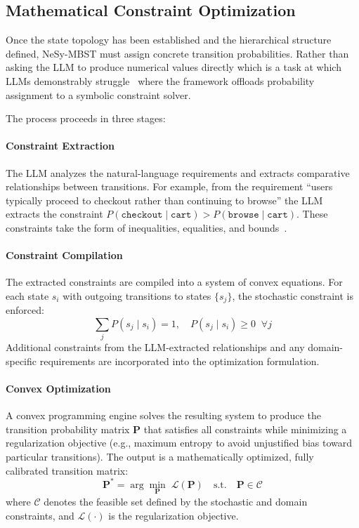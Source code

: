 \subsection{Mathematical Constraint Optimization}%
\label{subsec:constraint_opt}

Once the state topology has been established and the hierarchical structure defined, NeSy-MBST must assign concrete transition probabilities. Rather than asking the LLM to produce numerical values directly which is a task at which LLMs demonstrably struggle~\cite{llm_numerical_reasoning} where the framework offloads probability assignment to a symbolic constraint solver.

The process proceeds in three stages:

\paragraph{Constraint Extraction}
The LLM analyzes the natural-language requirements and extracts comparative relationships between transitions. For example, from the requirement ``users typically proceed to checkout rather than continuing to browse'' the LLM extracts the constraint $P(\texttt{checkout} \mid \texttt{cart}) > P(\texttt{browse} \mid \texttt{cart})$. These constraints take the form of inequalities, equalities, and bounds~\cite{boehr_constraints}.

\paragraph{Constraint Compilation}
The extracted constraints are compiled into a system of convex equations. For each state $s_i$ with outgoing transitions to states $\{s_j\}$, the stochastic constraint is enforced:
\begin{equation}
    \sum_{j} P(s_j \mid s_i) = 1, \quad P(s_j \mid s_i) \geq 0 \;\; \forall j
    \label{eq:stochastic}
\end{equation}
Additional constraints from the LLM-extracted relationships and any domain-specific requirements are incorporated into the optimization formulation.

\paragraph{Convex Optimization}
A convex programming engine solves the resulting system to produce the transition probability matrix $\mathbf{P}$ that satisfies all constraints while minimizing a regularization objective (e.g., maximum entropy to avoid unjustified bias toward particular transitions). The output is a mathematically optimized, fully calibrated transition matrix:
\begin{equation}
    \mathbf{P}^{*} = \arg\min_{\mathbf{P}} \; \mathcal{L}(\mathbf{P}) \quad \text{s.t.} \quad \mathbf{P} \in \mathcal{C}
    \label{eq:convex_opt}
\end{equation}
where $\mathcal{C}$ denotes the feasible set defined by the stochastic and domain constraints, and $\mathcal{L}(\cdot)$ is the regularization objective.

